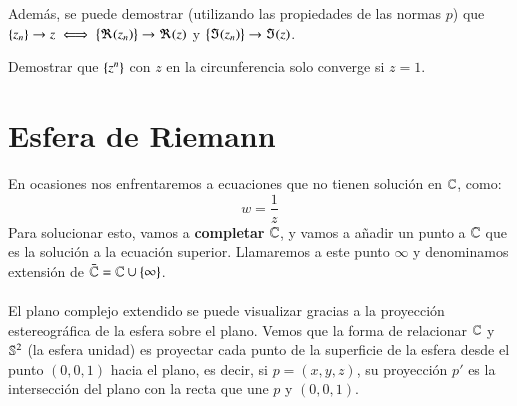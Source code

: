         Además, se puede demostrar (utilizando las propiedades de las normas $p$) que $\sdf{z_n} \to z \iff \sdf{\Re(z_n)} \to \Re(z)$ y $\sdf{\Im(z_n)} \to \Im(z)$.

        \begin{th_ex}
            Demostrar que $\sdf{z^n}$ con $z$ en la circunferencia solo converge si $z = 1$.
        \end{th_ex}

\section{Esfera de Riemann}
    En ocasiones nos enfrentaremos a ecuaciones que no tienen solución en $\C$, como:
    $$
        w = \frac{1}{z}
    $$
    Para solucionar esto, vamos a \textbf{completar} $\C$, y vamos a añadir un punto a $\C$ que es la solución a la ecuación superior. Llamaremos a este punto $\infty$ y denominamos extensión de $\bar \C = \C \cup \sdf{\infty}$.\\\\
    El plano complejo extendido se puede visualizar gracias a la proyección estereográfica de la esfera sobre el plano.
    Vemos que la forma de relacionar $\C$ y $\S^2$ (la esfera unidad) es proyectar cada punto de la superficie de la esfera desde el punto $(0, 0, 1)$ hacia el plano, es decir, si $p = (x, y, z)$, su proyección $p'$ es la intersección del plano con la recta que une $p$ y $(0, 0, 1)$.\\

